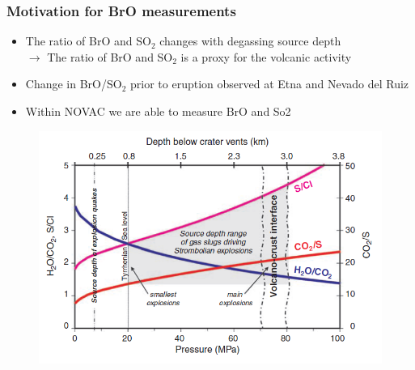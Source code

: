 \documentclass[aspectratio=169]{beamer} %
\begin{document}
\begin{frame}
	\frametitle{\color{mygreen}Motivation for BrO measurements\\%
		\color{mygreen}{\rule{0.8\textwidth}{2pt}}}
	\begin{multicols}{2}
		\begin{itemize}	
			\item The ratio of BrO and SO$_2$ changes with degassing source depth\\
			$\rightarrow$ The ratio of BrO and SO$_2$ is a proxy for the volcanic activity
			\item Change in BrO/SO$_2$ prior to eruption observed at Etna and Nevado del Ruiz	
			\item Within NOVAC we are able to measure BrO and So2
		\end{itemize}
		\begin{figure}
			\centering
			\includegraphics[width=1.1\linewidth]{../../Bilder/so2_bro}
			\label{fig:bro_so2}
		\end{figure}
		
	\end{multicols}
\end{frame}


\end{document}
